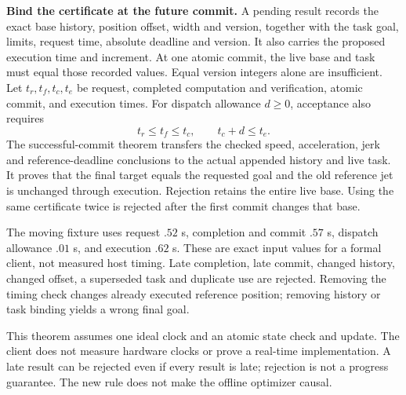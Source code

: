 \textbf{Bind the certificate at the future commit.}
A pending result records the exact base history, position offset, width and
version, together with the task goal, limits, request time, absolute deadline
and version. It also carries the proposed execution time and increment.
At one atomic commit, the live base and task must equal those recorded values.
Equal version integers alone are insufficient. Let $t_r,t_f,t_c,t_e$ be request,
completed computation and verification, atomic commit, and execution times.
For dispatch allowance $d\geq0$, acceptance also requires
\[
 t_r\leq t_f\leq t_c,\qquad t_c+d\leq t_e.
\]
The successful-commit theorem transfers the checked speed, acceleration, jerk
and reference-deadline conclusions to the actual appended history and live task.
It proves that the final target equals the requested goal and the old reference
jet is unchanged through execution. Rejection retains the entire live base.
Using the same certificate twice is rejected after the first commit changes
that base.

The moving fixture uses request $.52$ s, completion and commit $.57$ s,
dispatch allowance $.01$ s, and execution $.62$ s. These are exact input values
for a formal client, not measured host timing. Late completion, late commit,
changed history, changed offset, a superseded task and duplicate use are
rejected. Removing the timing check changes already executed reference position;
removing history or task binding yields a wrong final goal.

This theorem assumes one ideal clock and an atomic state check and update.
The client does not measure hardware clocks or prove a real-time implementation.
A late result can be rejected even if every result is late; rejection is not a
progress guarantee. The new rule does not make the offline optimizer causal.
